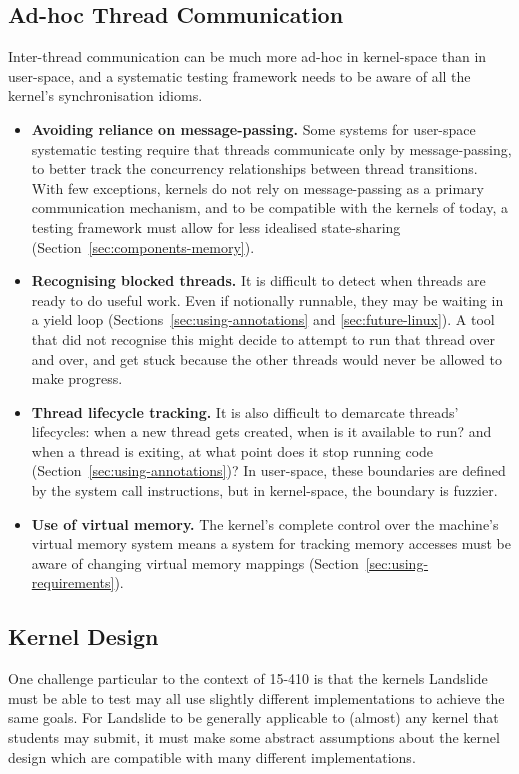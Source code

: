 \subsection{Ad-hoc Thread Communication}

Inter-thread communication can be much more ad-hoc in kernel-space than in user-space\cite{datacollider}, and a systematic testing framework needs to be aware of all the kernel's synchronisation idioms.

\begin{itemize}
	\item {\bf Avoiding reliance on message-passing.} Some systems for user-space systematic testing require that threads communicate only by message-passing, to better track the concurrency relationships between thread transitions\cite{dbug-ssv}. With few exceptions\cite{barrelfish}, kernels do not rely on message-passing as a primary communication mechanism, and to be compatible with the kernels of today, a testing framework must allow for less idealised state-sharing (Section~\ref{sec:components-memory}).
	\item {\bf Recognising blocked threads.} It is difficult to detect when threads are ready to do useful work. Even if notionally runnable, they may be waiting in a yield loop (Sections~\ref{sec:using-annotations} and \ref{sec:future-linux}). A tool that did not recognise this might decide to attempt to run that thread over and over, and get stuck because the other threads would never be allowed to make progress.
	\item {\bf Thread lifecycle tracking.} It is also difficult to demarcate threads' lifecycles: when a new thread gets created, when is it available to run? and when a thread is exiting, at what point does it stop running code (Section~\ref{sec:using-annotations})? In user-space, these boundaries are defined by the system call instructions, but in kernel-space, the boundary is fuzzier.
	\item {\bf Use of virtual memory.} The kernel's complete control over the machine's virtual memory system means a system for tracking memory accesses must be aware of changing virtual memory mappings (Section~\ref{sec:using-requirements}).
\end{itemize}

\subsection{Kernel Design}

One challenge particular to the context of 15-410 is that the kernels Landslide must be able to test may all use slightly different implementations to achieve the same goals. For Landslide to be generally applicable to (almost) any kernel that students may submit, it must make some abstract assumptions about the kernel design which are compatible with many different implementations.

